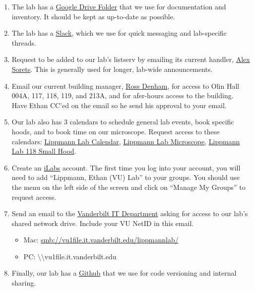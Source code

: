 \documentclass[
]{book}
\begin{document}
\begin{enumerate}
\def\labelenumi{\arabic{enumi}.}
\item
  The lab has a \href{https://drive.google.com/drive/folders/0Bwvn9S-4oeMmeHhzUS1nM0FNak0?usp=sharing}{Google Drive Folder} that we use for documentation and inventory. It should be kept as up-to-date as possible.
\item
  The lab has a \href{https://lippmann-lab.slack.com/join/signup\#/}{Slack}, which we use for quick messaging and lab-specific threads.
\item
  Request to be added to our lab's listserv by emailing its current handler, \href{mailto:alexander.g.sorets@vanderbilt.edu}{Alex Sorets}. This is generally used for longer, lab-wide announcements.
\item
  Email our current building manager, \href{mailto:ross.denham@vanderbilt.edu}{Ross Denham}, for access to Olin Hall 004A, 117, 118, 119, and 213A, and for afer-hours access to the building. Have Ethan CC'ed on the email so he send his approval to your email.
\item
  Our lab also has 3 calendars to schedule general lab events, book specific hoods, and to book time on our microscope. Request access to these calendars: \href{https://calendar.google.com/calendar/u/0?cid=bXFkOWE3bjM3MTkxbzluYWVtbWw0NDd2bGtAZ3JvdXAuY2FsZW5kYXIuZ29vZ2xlLmNvbQ}{Lippmann Lab Calendar}, \href{https://calendar.google.com/calendar/u/0?cid=ZjNkMXBkbmFwZzc0NWR2YmVmNXU0bGN1YjBAZ3JvdXAuY2FsZW5kYXIuZ29vZ2xlLmNvbQ}{Lippmann Lab Microscope}, \href{https://calendar.google.com/calendar/u/0?cid=MGk3NGZpdm5ua2JyZjMyc2duNTE2aGMxOWdAZ3JvdXAuY2FsZW5kYXIuZ29vZ2xlLmNvbQ}{Lippmann Lab 118 Small Hood}.
\item
  Create an \href{https://vanderbilt.corefacilities.org/landing/2191}{iLabs} account. The first time you log into your account, you will need to add ``Lippmann, Ethan (VU) Lab'' to your groups. You should use the menu on the left side of the screen and click on ``Manage My Groups'' to request access.
\item
  Send an email to the \href{mailto:dts.se.support@Vanderbilt.Edu}{Vanderbilt IT Department} asking for access to our lab's shared network drive. Include your VU NetID in this email.

  \begin{itemize}
  \item
    Mac: \url{smb://vu1file.it.vanderbilt.edu/lippmannlab/}
  \item
    PC: \textbackslash\textbackslash vu1file.it.vanderbilt.edu\lippmannlab~
  \end{itemize}
\item
  Finally, our lab has a \href{https://github.com/LippmannLab}{Github} that we use for code versioning and internal sharing.
\end{enumerate}
\end{document}

